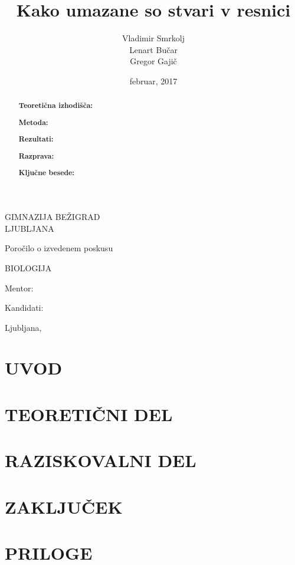 \documentclass[12pt, a4paper]{report}
\begin{document}
\title{Kako umazane so stvari v resnici}
\author{Vladimir Smrkolj\\Lenart Bučar\\Gregor Gajič}
\date{februar, 2017}

\sffamily

\begin{titlepage}
\centering


{\Large{GIMNAZIJA BEŽIGRAD\\[2mm]LJUBLJANA}}

\vspace{3.5cm}

{\large Poročilo o izvedenem poskusu

\vspace{1cm}

BIOLOGIJA
}

\vspace{3.5cm}

\makeatletter
{\LARGE{\textbf{\@title}}}
\makeatother


\vfill


\parbox{4cm}{Mentor:}
\hfill
\makeatletter
Kandidati: \parbox[t]{3cm}{\@author}
\makeatother

\vspace{3cm}

\makeatletter
Ljubljana, \@date
\makeatother

\end{titlepage}


\begin{abstract}

\textbf{Teoretična izhodišča:}

\textbf{Metoda:}

\textbf{Rezultati:}

\textbf{Razprava:}

\textbf{Ključne besede:}

\end{abstract}

\tableofcontents

\chapter{UVOD}

\chapter{TEORETIČNI DEL}

\chapter{RAZISKOVALNI DEL}

\chapter{ZAKLJUČEK}

\chapter{PRILOGE}
\end{document}
